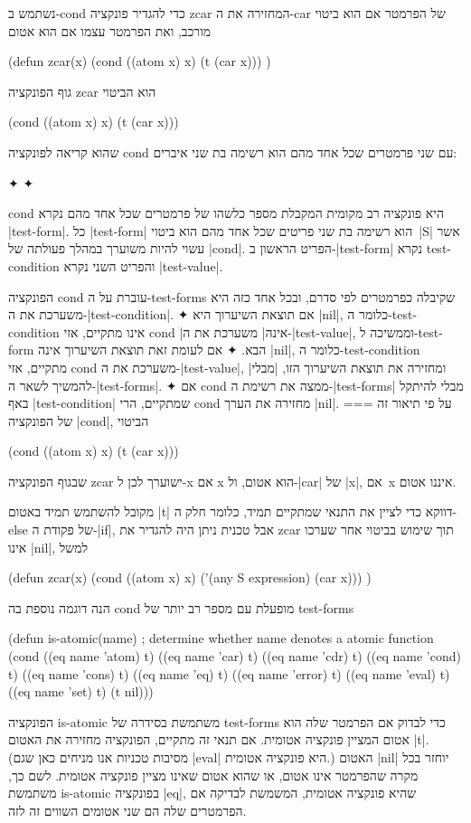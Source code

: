 נשתמש ב-cond כדי להגדיר פונקציה zcar המחזירה את ה-car של הפרמטר אם
הוא ביטוי מורכב, ואת הפרמטר עצמו אם הוא אטום
\begin{LISP}
(defun zcar(x)
  (cond ((atom x) x) (t (car x)))
)
\end{LISP}
גוף הפונקציה zcar הוא הביטוי
\begin{LISP}
  (cond ((atom x) x) (t (car x)))
\end{LISP}
שהוא קריאה לפונקציה cond עם שני פרמטרים שכל אחד מהם הוא רשימה בת שני איברים:
\begin{LTR}
  \begin{itemize}
    ✦ 
    ✦ 
  \end{itemize}
\end{LTR}
cond היא פונקציה רב מקומית המקבלת מספר כלשהו של פרמטרים שכל אחד מהם נקרא
\E|test-form|. כל \E|test-form| הוא רשימה בת שני פריטים שכל אחד מהם הוא ביטוי~\E|S|
אשר עשוי להיות משוערך במהלך פעולתה של \E|cond|. הפריט הראשון ב-\E|test-form|
נקרא test-condition והפריט השני נקרא \E|test-value|.

הפונקציה cond עוברת על ה-test-forms שקיבלה כפרמטרים לפי סדרם, ובכל אחד כזה היא
משערכת את ה-\E|test-condition|.
✦ אם תוצאת השיערוך היא \E|nil|, כלומר ה-test-condition אינו מתקיים, אזי cond
\ע|אינה| משערכת את ה-\E|test-value|, וממשיכה ל-test-form הבא.
✦ אם לעומת זאת תוצאת השיערוך אינה \E|nil|, כלומר ה-test-condition מתקיים, אזי
cond משערכת את ה-\E|test-value|, ומחזירה את תוצאת השיערוך הזו, \ע|מבלי|
להמשיך לשאר ה-\E|test-forms|.
✦ אם cond ממצה את רשימת ה-\E|test-forms| מבלי להיתקל באף \E|test-condition|
שמתקיים, הרי cond מחזירה את הערך \E|nil|.
===
על פי תיאור זה של הפונקציה \E|cond|, הביטוי \begin{LISP}
  (cond ((atom x) x) (t (car x)))
\end{LISP}
שבגוף הפונקציה zcar ישוערך לכן ל-x אם x הוא אטום, ול-\E|car| של \E|x|, אם~x
איננו אטום.

מקובל להשתמש תמיד באטום \E|t| דווקא כדי לציין את התנאי שמתקיים תמיד, כלומר חלק
ה-else של פקודת ה-\E|if|, אבל טכנית ניתן היה להגדיר את zcar תוך שימוש בביטוי
אחר שערכו אינו \E|nil|, למשל
\begin{LISP}
(defun zcar(x)
  (cond ((atom x) x) ('(any S expression) (car x)))
)
\end{LISP}
הנה דוגמה נוספת בה cond מופעלת עם מספר רב יותר של test-forms
\begin{LISP}
(defun is-atomic(name) ; determine whether name denotes a atomic function
  (cond ((eq name 'atom) t)
        ((eq name 'car) t)
        ((eq name 'cdr) t)
        ((eq name 'cond) t)
        ((eq name 'cons) t)
        ((eq name 'eq) t)
        ((eq name 'error) t)
        ((eq name 'eval) t)
        ((eq name 'set) t)
        (t nil)))
\end{LISP}
הפונקציה is-atomic משתמשת בסידרה של test-forms כדי לבדוק אם הפרמטר שלה הוא
אטום המציין פונקציה אטומית. אם תנאי זה מתקיים, הפונקציה מחזירה את האטום
\E|t|. (מסיבות טכניות אנו מניחים כאן שגם \T|eval| היא פונקציה אטומית.)
האטום \E|nil| יוחזר בכל מקרה שהפרמטר אינו אטום, או שהוא אטום שאינו מציין
פונקציה אטומית. לשם כך, משתמשת
is-atomic בפונקציה \T|eq|, שהיא פונקציה אטומית, המשמשת לבדיקה אם הפרמטרים
שלה הם שני אטומים השווים זה לזה.

